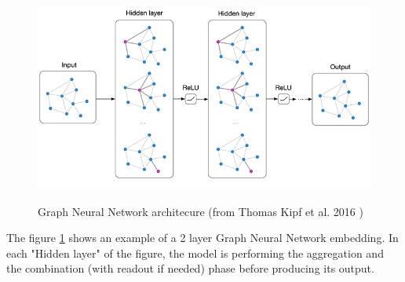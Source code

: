 \begin{figure}[H]
\centering
\includegraphics[scale=0.45]{./img/kipf-2.png}\\[2cm] 
\caption{Graph Neural Network architecure (from  Thomas Kipf et al. 2016 \cite{gcn}) }\label{fig:GNN_schema}
\end{figure}

The figure \ref{fig:GNN_schema} shows an example of a 2 layer Graph Neural Network embedding. In each "Hidden layer" of the figure, the model is performing the aggregation and the combination (with readout if needed) phase before producing its output.
 







